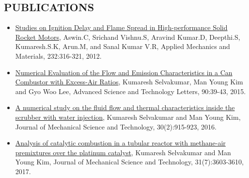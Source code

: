 \documentclass{res}
\begin{document}
	\begin{resume}
	
	
	
	
	
	
	
	
		
	
	
	
	\section{\MakeUppercase{Publications}} \vskip 0.35in
	\begin{itemize}[leftmargin=\parindent]
	\setlength{\itemsep}{4pt}
	
	\item[] \href{https://www.scientific.net/AMM.232.316}{Studies on Ignition Delay and Flame Spread in High-performance Solid Rocket Motors}, Aswin.C, Srichand Vishnu.S, Aravind Kumar.D, Deepthi.S, Kumaresh.S.K, Arun.M, and Sanal Kumar V.R, Applied Mechanics and Materials, 232:316-321, 2012.
	\item[] \href{https://link.springer.com/article/10.1007/s12206-016-0145-2}{Numerical Evaluation of the Flow and Emission Characteristics in a Can Combustor with Excess-Air Ratios}, Kumaresh Selvakumar, Man Young Kim and Gyo Woo Lee, Advanced Science and Technology Letters, 90:39-43, 2015.
	\item[] \href{https://link.springer.com/article/10.1007/s12206-016-0145-2}{A numerical study on the fluid flow and thermal characteristics inside the scrubber with water injection}, Kumaresh Selvakumar and Man Young Kim, Journal of Mechanical Science and Technology, 30(2):915-923, 2016.
	\item[] \href{https://link.springer.com/article/10.1007/s12206-017-0646-7}{Analysis of catalytic combustion in a tubular reactor with methane-air premixtures over the platinum catalyst}, Kumaresh Selvakumar and Man Young Kim, Journal of Mechanical Science and Technology, 31(7):3603-3610, 2017.
	\end{itemize}
	
	
	
		
	

\end{resume}
\end{document}
